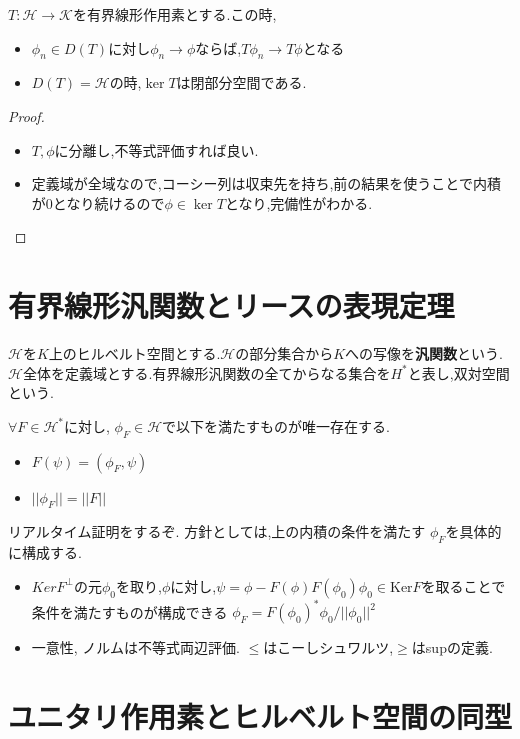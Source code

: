 \documentclass[uplatex]{jsbook}
\begin{document}
\begin{prop}
$T: \mathcal{H} \to \mathcal{K}$を有界線形作用素とする.この時,
\begin{itemize}
  \item $\phi_n \in D(T)$に対し$\phi_n \to \phi$ならば,$T\phi_n \to T\phi$となる
  \item $D(T) = \mathcal{H}$の時,$\ker T$は閉部分空間である.
\end{itemize}
\end{prop}
\begin{proof}
  \begin{itemize}
    \item  $T, \phi$に分離し,不等式評価すれば良い.
    \item 定義域が全域なので,コーシー列は収束先を持ち,前の結果を使うことで内積が0となり続けるので$\phi \in \ker T$となり,完備性がわかる.
  \end{itemize}
\end{proof}

\section{有界線形汎関数とリースの表現定理}
$\mathcal{H}$を$K$上のヒルベルト空間とする.$\mathcal{H}$の部分集合から$K$への写像を\textbf{汎関数}という.
$\mathcal{H}$全体を定義域とする.有界線形汎関数の全てからなる集合を$H^*$と表し,双対空間という.

\begin{thm}[リースの表現定理]
$\forall F \in \mathcal{H}^*$に対し, $\phi_F \in \mathcal{H}$で以下を満たすものが唯一存在する.
\begin{itemize}
  \item $F(\psi) = (\phi_F, \psi)$
  \item $||\phi_F|| = ||F||$
\end{itemize}
\end{thm}
リアルタイム証明をするぞ.
方針としては,上の内積の条件を満たす $\phi_F$を具体的に構成する.
\begin{itemize}
  \item $KerF^{\perp}$の元$\phi_0$を取り,$\phi$に対し,$\psi = \phi - F(\phi)F(\phi_0)\phi_0 \in \mathrm{Ker}F$を取ることで条件を満たすものが構成できる
  $\phi_F = F(\phi_0)^* \phi_0 / || \phi_0||^2$
 \item 一意性, ノルムは不等式両辺評価. $\le $はこーしシュワルツ,$ \ge $はsupの定義.
\end{itemize}

\section{ユニタリ作用素とヒルベルト空間の同型}
\end{document}
